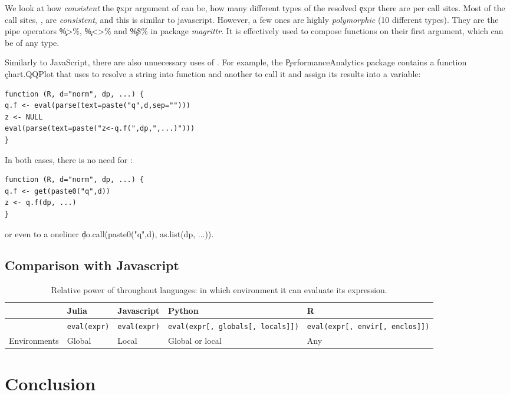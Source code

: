 \documentclass[screen,acmsmall]{acmart}
\begin{document}
We look at how \emph{consistent} the \c{expr} argument of \eval can
be, \ie how many different types of the resolved \c{expr} there are
per call sites. Most of the call sites, \ie \PercentMonomorphic, are
\emph{consistent}, and this is similar to javascript. However, a few
ones are highly \emph{polymorphic} (10 different types). They are the
pipe operators \c{\%>\%}, \c{\%<>\%} and \c{\%\$\%} in package
\emph{magrittr}. It is effectively used to compose functions on their
first argument, which can be of any type.

Similarly to JavaScript, there are also unnecessary uses of \eval. For
example, the \c{PerformanceAnalytics} package contains a function
\c{chart.QQPlot} that uses \eval to resolve a string into function and
another to call it and assign its results into a variable:
\begin{lstlisting}
function (R, d="norm", dp, ...) {
q.f <- eval(parse(text=paste("q",d,sep="")))
z <- NULL
eval(parse(text=paste("z<-q.f(",dp,",...)")))
}
\end{lstlisting}
  In both cases, there is no need for \eval:
\begin{lstlisting}
function (R, d="norm", dp, ...) {
q.f <- get(paste0("q",d))
z <- q.f(dp, ...)
}
\end{lstlisting}
  or even to a oneliner \c{do.call(paste0("q",d), as.list(dp, ...))}.

\subsection{Comparison with Javascript}




\begin{table}[h]
	\begin{tabularx}{\textwidth}{|X|X|X|X|X|}
		\hline
		& Julia & Javascript & Python & R \tabularnewline
		\hline %
		{\eval} & \texttt{eval(expr)} & \texttt{eval(expr)} & \texttt{eval(expr[, globals[, locals]])} &  \texttt{eval(expr[, envir[, enclos]])}  \tabularnewline
		\hline
		Environments &Global  & Local & Global or local  & Any \tabularnewline
		\hline
	\end{tabularx}
	\caption{Relative power of \eval throughout languages: in which environment it can evaluate its expression.}
\end{table}


\section{Conclusion}




\end{document}

